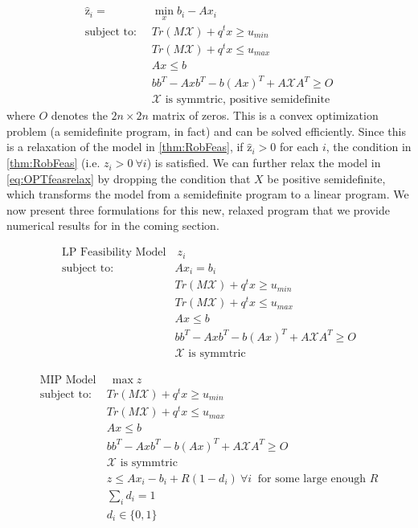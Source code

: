 \documentclass[11pt]{article}
\theoremstyle{plain}
\theoremstyle{definition}
\theoremstyle{remark}
\begin{document}
\begin{subequations}\label{eq:OPTfeasrelax}
\begin{align}
\hat{\mathrm{z}}_{i} = &\min_x b_i-Ax_i  \\
 \text{subject to: } \ &Tr\left(M\mathcal{X}\right)+q^tx \geq u_{min} \\
 & Tr\left(M\mathcal{X}\right)+q^tx \leq u_{max} \\
 	&Ax\leq b \\
 	&bb^T-Axb^T-b(Ax)^T+A\mathcal{X}A^T\geq O \\
 	&\mathcal{X} \text{ is symmtric, positive semidefinite}
\end{align}
\end{subequations}
where $O$ denotes the $2n \times 2n$ matrix of zeros. This is a convex optimization problem (a semidefinite program, in fact) and can be solved efficiently. Since this is a relaxation of the model in \cref{thm:RobFeas}, if $\hat{\mathrm{z}}_i>0$ for each $i$, the condition in \cref{thm:RobFeas} (i.e. $z_i>0 \ \forall i$) is satisfied. We can further relax the model in \eqref{eq:OPTfeasrelax} by dropping the condition that $X$ be positive semidefinite, which transforms the model from a semidefinite program to a linear program. We now present three formulations for this new, relaxed program that we provide numerical results for in the coming section.

\begin{subequations}\label{eq:OPTfeasrelaxLP1}
\begin{align}
 \text{LP Feasibility Model}& \ z_i  \\
 \text{subject to: } \ &Ax_i= b_i \\
 &Tr\left(M\mathcal{X}\right)+q^tx \geq u_{min} \\
 & Tr\left(M\mathcal{X}\right)+q^tx \leq u_{max} \\
 	&Ax\leq b \\
 	&bb^T-Axb^T-b(Ax)^T+A\mathcal{X}A^T\geq O \\
 	&\mathcal{X} \text{ is symmtric}
\end{align}
\end{subequations}

\begin{subequations}\label{eq:OPTfeasrelaxLP2}
\begin{align}
 \text{MIP Model}& \ \max z  \\
 \text{subject to: } \ &Tr\left(M\mathcal{X}\right)+q^tx \geq u_{min} \\
 & Tr\left(M\mathcal{X}\right)+q^tx \leq u_{max} \\
 	&Ax\leq b \\
 	&bb^T-Axb^T-b(Ax)^T+A\mathcal{X}A^T\geq O \\
 	&\mathcal{X} \text{ is symmtric} \\
 	& z\leq Ax_i-b_i+R(1-d_i) \ \forall i \ \text{ for some large enough $R$} \\
 	& \sum\limits_i d_i=1 \\
 	& d_i\in\{0,1\}
\end{align}
\end{subequations}
 
\end{document}
